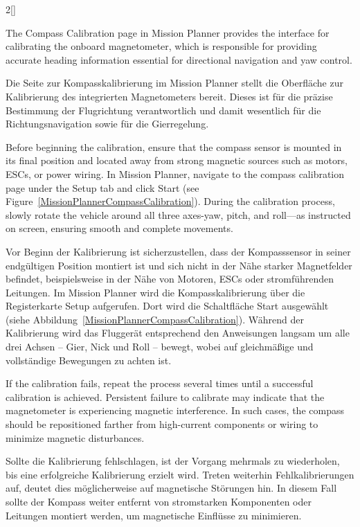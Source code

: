 \begin{paracol}{2}[]
\colstart

The Compass Calibration page in Mission Planner provides the interface for calibrating the onboard magnetometer, which is responsible for providing accurate heading information essential for directional navigation and yaw control.

\colger

Die Seite zur Kompasskalibrierung im Mission Planner stellt die Oberfläche zur Kalibrierung des integrierten Magnetometers bereit. Dieses ist für die präzise Bestimmung der Flugrichtung verantwortlich und damit wesentlich für die Richtungsnavigation sowie für die Gierregelung.

\coleng

Before beginning the calibration, ensure that the compass sensor is mounted in its final position and located away from strong magnetic sources such as motors, ESCs, or power wiring. In Mission Planner, navigate to the compass calibration page under the Setup tab and click Start (see Figure~\ref{MissionPlannerCompassCalibration}). During the calibration process, slowly rotate the vehicle around all three axes-yaw, pitch, and roll—as instructed on screen, ensuring smooth and complete movements.

\colger

Vor Beginn der Kalibrierung ist sicherzustellen, dass der Kompasssensor in seiner endgültigen Position montiert ist und sich nicht in der Nähe starker Magnetfelder befindet, beispielsweise in der Nähe von Motoren, ESCs oder stromführenden Leitungen. Im Mission Planner wird die Kompasskalibrierung über die Registerkarte Setup aufgerufen. Dort wird die Schaltfläche Start ausgewählt (siehe Abbildung~\ref{MissionPlannerCompassCalibration}). Während der Kalibrierung wird das Fluggerät entsprechend den Anweisungen langsam um alle drei Achsen -- Gier, Nick und Roll -- bewegt, wobei auf gleichmäßige und vollständige Bewegungen zu achten ist.

\coleng

If the calibration fails, repeat the process several times until a successful calibration is achieved. Persistent failure to calibrate may indicate that the magnetometer is experiencing magnetic interference. In such cases, the compass should be repositioned farther from high-current components or wiring to minimize magnetic disturbances.

\colger

Sollte die Kalibrierung fehlschlagen, ist der Vorgang mehrmals zu wiederholen, bis eine erfolgreiche Kalibrierung erzielt wird. Treten weiterhin Fehlkalibrierungen auf, deutet dies möglicherweise auf magnetische Störungen hin. In diesem Fall sollte der Kompass weiter entfernt von stromstarken Komponenten oder Leitungen montiert werden, um magnetische Einflüsse zu minimieren.


\end{paracol}
